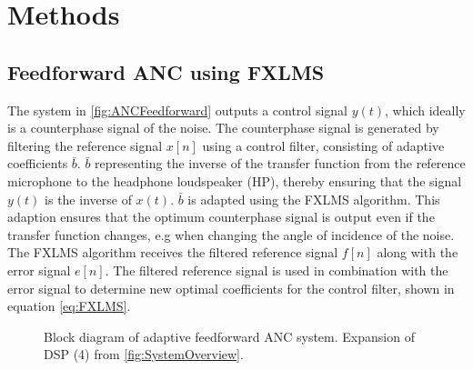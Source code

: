 \section{Methods} \label{sec:methods}
\subsection{Feedforward ANC using FXLMS}


The system in \autoref{fig:ANCFeedforward} outputs a control signal $y(t)$, which ideally is a counterphase signal of the noise. The counterphase signal is generated by filtering the reference signal $x[n]$ using a control filter, consisting of adaptive coefficients $\bar{b}$. $\bar{b}$ representing the inverse of the transfer function from the reference microphone to the headphone loudspeaker (HP), thereby ensuring that the signal $y(t)$ is the inverse of $x(t)$. $\bar{b}$ is adapted using the FXLMS algorithm. This adaption ensures that the optimum counterphase signal is output even if the transfer function changes, e.g when changing the angle of incidence of the noise. The FXLMS algorithm receives the filtered reference signal $f[n]$ along with the error signal $e[n]$. The filtered reference signal is used in combination with the error signal to determine new optimal coefficients for the control filter, shown in equation \ref{eq:FXLMS}. 



\begin{figure}[H]
	\centering
		
	\caption{Block diagram of adaptive feedforward ANC system. Expansion of DSP (4) from \autoref{fig:SystemOverview}.}
	\label{fig:ANCFeedforward}
\end{figure}



